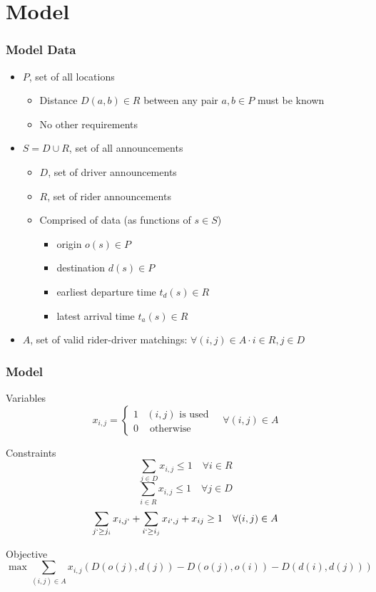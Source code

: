 \documentclass{beamer}
\begin{document}
\section{Model}
\begin{frame}
\frametitle{Model Data}
\begin{itemize}
	\item \(P\), set of all locations
	\begin{itemize}
		\item Distance \(D(a, b) \in R\) between any pair \(a, b \in P\) must be known
		\item No other requirements
	\end{itemize}
	\item \(S = D \cup R\), set of all announcements
	\begin{itemize}
		\item \(D\), set of driver announcements
		\item \(R\), set of rider announcements
		\item Comprised of data (as functions of \(s \in S\))
		\begin{itemize}
		 	\item origin \(o(s) \in P\)
		 	\item destination \(d(s) \in P\)
		 	\item earliest departure time \(t_d(s)\in R\)
		 	\item latest arrival time \(t_a(s) \in R\)
		\end{itemize} 
	\end{itemize}
    \item \(A\), set of valid rider-driver matchings: \(\forall (i, j) \in A \cdot i \in R, j \in D\)
\end{itemize}
\end{frame}

\begin{frame}
\frametitle{Model}
Variables
\begin{equation*}
x_{i,j} = \begin{cases}
1 & (i,j) \text{ is used} \\
0 & \text{ otherwise }
\end{cases}
\quad \forall (i,j) \in A
\end{equation*}
\[\]

Constraints
\[\sum_{j \in D} x_{i,j} \leq 1 \quad \forall i \in R\]
\[\sum_{i \in R} x_{i,j} \leq 1 \quad \forall j \in D \]
\[\sum_{j` \geq j_i} x_{i,j`} +  \sum_{i` \geq i_j} x_{i`,j} + x_{ij}\geq 1 \quad \forall (i,j)\in A \]

Objective
\[\max \sum_{(i,j) \in A} x_{i,j}\left(D(o(j), d(j)) - D(o(j), o(i)) - D(d(i), d(j)) \right)\]
\end{frame}
\end{document}
